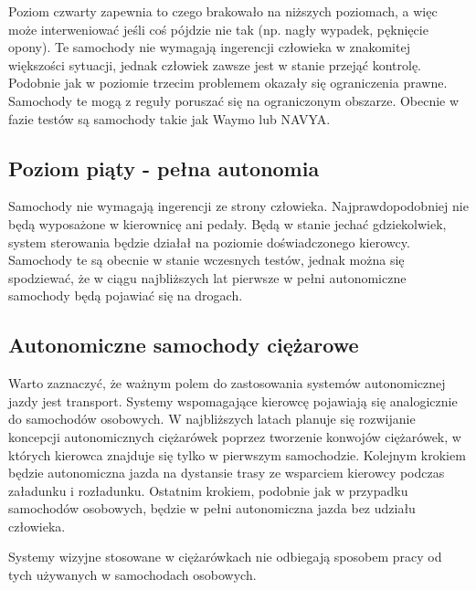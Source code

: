 Poziom czwarty zapewnia to czego brakowało na niższych poziomach, a więc może interweniować jeśli coś pójdzie nie tak (np. nagły wypadek, pęknięcie opony). %
Te samochody nie wymagają ingerencji człowieka w znakomitej większości sytuacji, jednak człowiek zawsze jest w stanie przejąć kontrolę. 
Podobnie jak w poziomie trzecim problemem okazały się ograniczenia prawne. 
Samochody te mogą z reguły poruszać się na ograniczonym obszarze. 
Obecnie w fazie testów są samochody takie jak Waymo lub NAVYA.

\subsection{Poziom piąty - pełna autonomia}
Samochody nie wymagają ingerencji ze strony człowieka. 
Najprawdopodobniej nie będą wyposażone w kierownicę ani pedały. 
Będą w stanie jechać gdziekolwiek, system sterowania będzie działał na poziomie doświadczonego kierowcy. 
Samochody te są obecnie w stanie wczesnych testów, jednak można się spodziewać, że w ciągu najbliższych lat pierwsze w pełni autonomiczne samochody będą pojawiać się na drogach.

\subsection{Autonomiczne samochody ciężarowe}

Warto zaznaczyć, że ważnym polem do zastosowania systemów autonomicznej jazdy jest transport. %
Systemy wspomagające kierowcę pojawiają się analogicznie do samochodów osobowych. %
W najbliższych latach planuje się rozwijanie koncepcji autonomicznych ciężarówek poprzez tworzenie konwojów ciężarówek, w których kierowca znajduje się tylko w pierwszym samochodzie. %
Kolejnym krokiem będzie autonomiczna jazda na dystansie trasy ze wsparciem kierowcy podczas załadunku i rozładunku. 
Ostatnim krokiem, podobnie jak w przypadku samochodów osobowych, będzie w pełni autonomiczna jazda bez udziału człowieka.

Systemy wizyjne stosowane w ciężarówkach nie odbiegają sposobem pracy od tych używanych w samochodach osobowych.




